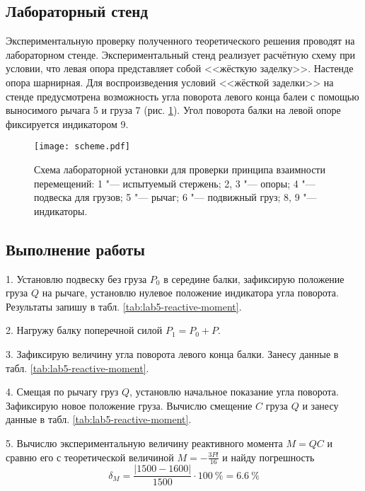 \subsection{Лабораторный стенд}
Экспериментальную проверку полученного теоретического решения проводят на лабораторном стенде.
Экспериментальный стенд реализует расчётную схему при условии, что левая опора представляет собой <<жёсткую заделку>>.
Настенде опора шарнирная.
Для воспроизведения условий <<жёсткой заделки>> на стенде предусмотрена возможность угла поворота левого конца балеи с помощью выносимого рычага 5 и груза 7 (рис. \ref{fig:scheme}).
Угол поворота балки на левой опоре фиксируется индикатором 9.

\begin{figure}[!ht]
    \centering
    \texttt{[image: scheme.pdf]}
    \caption{Схема лабораторной установки для проверки принципа взаимности перемещений:
        1 "--- испытуемый стержень;
        2, 3 "--- опоры;
        4 "--- подвеска для грузов;
        5 "--- рычаг;
        6 "--- подвижный груз;
        8, 9 "--- индикаторы.}
        \label{fig:scheme}
    \end{figure}

\subsection{Выполнение работы}

1. Установлю подвеску без груза $P_0$ в середине балки, зафиксирую положение груза $Q$ на рычаге, установлю нулевое положение индикатора угла поворота.
Результаты запишу в табл. \ref{tab:lab5-reactive-moment}.

2. Нагружу балку поперечной силой $P_1 = P_0 + P$.

3. Зафиксирую величину угла поворота левого конца балки.
Занесу данные в табл. \ref{tab:lab5-reactive-moment}.

4. Смещая по рычагу груз $Q$, установлю начальное показание угла поворота.
Зафиксирую новое положение груза.
Вычислю смещение $C$ груза $Q$ и занесу данные в табл. \ref{tab:lab5-reactive-moment}.

5. Вычислю экспериментальную величину реактивного момента $M = QC$ и сравню его с теоретической величиной $M = -\frac{3 P l}{16}$ и найду погрешность
\[
    \delta_M = \frac{|1500 - 1600|}{1500} \cdot 100~\% = 6.6~\%
\]

